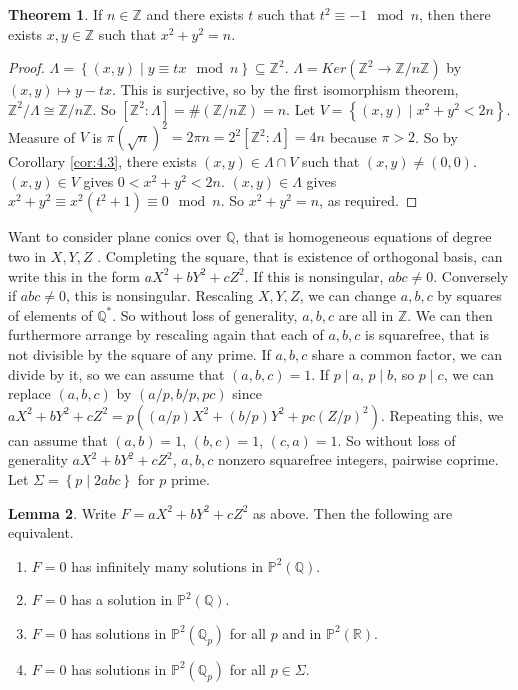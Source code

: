 \documentclass{article}
\newcommand{\Z}{\mathbb{Z}}
\newcommand{\Q}{\mathbb{Q}}
\newcommand{\R}{\mathbb{R}}
\renewcommand{\P}{\mathbb{P}}
\newcommand{\rb}[1]{\left( #1 \right)}
\renewcommand{\sb}[1]{\left[ #1 \right]}
\newcommand{\cb}[1]{\left\{ #1 \right\}}
\theoremstyle{definition}\newtheorem{definition}{Definition}[section]
\theoremstyle{definition}\newtheorem{remark}[definition]{Remark}
\theoremstyle{definition}\newtheorem*{example}{Example}
\theoremstyle{definition}\newtheorem*{note}{Note}
\newtheorem{lemma}[definition]{Lemma}
\newtheorem{theorem}[definition]{Theorem}
\begin{document}

\begin{theorem}
If $ n \in \Z $ and there exists $ t $ such that $ t^2 \equiv -1 \mod n $, then there exists $ x, y \in \Z $ such that $ x^2 + y^2 = n $.
\end{theorem}

\begin{proof}
$ \Lambda = \cb{\rb{x, y} \mid y \equiv tx \mod n} \subseteq \Z^2 $. $ \Lambda = Ker\rb{\Z^2 \to \Z / n\Z} $ by $ \rb{x, y} \mapsto y - tx $. This is surjective, so by the first isomorphism theorem, $ \Z^2 / \Lambda \cong \Z / n\Z $. So $ \sb{\Z^2 : \Lambda} = \#\rb{\Z / n\Z} = n $. Let $ V = \cb{\rb{x, y} \mid x^2 + y^2 < 2n} $. Measure of $ V $ is $ \pi\rb{\sqrt{n}}^2 = 2\pi n = 2^2\sb{\Z^2 : \Lambda} = 4n $ because $ \pi > 2 $. So by Corollary \ref{cor:4.3}, there exists $ \rb{x, y} \in \Lambda \cap V $ such that $ \rb{x, y} \ne \rb{0, 0} $. $ \rb{x, y} \in V $ gives $ 0 < x^2 + y^2 < 2n $. $ \rb{x, y} \in \Lambda $ gives $ x^2 + y^2 \equiv x^2\rb{t^2 + 1} \equiv 0 \mod n $. So $ x^2 + y^2 = n $, as required.
\end{proof}

Want to consider plane conics over $ \Q $, that is homogeneous equations of degree two in $ X, Y, Z $ . Completing the square, that is existence of orthogonal basis, can write this in the form $ aX^2 + bY^2 + cZ^2 $. If this is nonsingular, $ abc \ne 0 $. Conversely if $ abc \ne 0 $, this is nonsingular. Rescaling $ X, Y, Z $, we can change $ a, b, c $ by squares of elements of $ \Q^* $. So without loss of generality, $ a, b, c $ are all in $ \Z $. We can then furthermore arrange by rescaling again that each of $ a, b, c $ is squarefree, that is not divisible by the square of any prime. If $ a, b, c $ share a common factor, we can divide by it, so we can assume that $ \rb{a, b, c} = 1 $. If $ p \mid a $, $ p \mid b $, so $ p \mid c $, we can replace $ \rb{a, b, c} $ by $ \rb{a / p, b / p, pc} $ since $ aX^2 + bY^2 + cZ^2 = p\rb{\rb{a / p}X^2 + \rb{b / p}Y^2 + pc\rb{Z / p}^2} $. Repeating this, we can assume that $ \rb{a, b} = 1 $, $ \rb{b, c} = 1 $, $ \rb{c, a} = 1 $. So without loss of generality $ aX^2 + bY^2 + cZ^2 $, $ a, b, c $ nonzero squarefree integers, pairwise coprime. Let $ \Sigma = \cb{p \mid 2abc} $ for $ p $ prime.

\begin{lemma}
Write $ F = aX^2 + bY^2 + cZ^2 $ as above. Then the following are equivalent.
\begin{enumerate}
\item $ F = 0 $ has infinitely many solutions in $ \P^2\rb{\Q} $.
\item $ F = 0 $ has a solution in $ \P^2\rb{\Q} $.
\item $ F = 0 $ has solutions in $ \P^2\rb{\Q_p} $ for all $ p $ and in $ \P^2\rb{\R} $.
\item $ F = 0 $ has solutions in $ \P^2\rb{\Q_p} $ for all $ p \in \Sigma $.
\end{enumerate}
\end{lemma}
\end{document}
